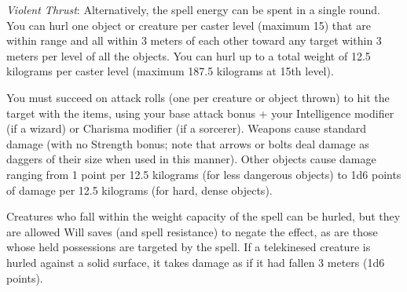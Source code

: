 {	\textit{Violent Thrust}:
	Alternatively, the spell energy can be spent in a single round. You can hurl one object or creature per caster level (maximum 15) that are within range and all within 3 meters of each other toward any target within 3 meters per level of all the objects. You can hurl up to a total weight of 12.5 kilograms per caster level (maximum 187.5 kilograms at 15th level).

	You must succeed on attack rolls (one per creature or object thrown) to hit the target with the items, using your base attack bonus + your Intelligence modifier (if a wizard) or Charisma modifier (if a sorcerer). Weapons cause standard damage (with no Strength bonus; note that arrows or bolts deal damage as daggers of their size when used in this manner). Other objects cause damage ranging from 1 point per 12.5 kilograms (for less dangerous objects) to 1d6 points of damage per 12.5 kilograms (for hard, dense objects).

	Creatures who fall within the weight capacity of the spell can be hurled, but they are allowed Will saves (and spell resistance) to negate the effect, as are those whose held possessions are targeted by the spell. If a telekinesed creature is hurled against a solid surface, it takes damage as if it had fallen 3 meters (1d6 points).

}
